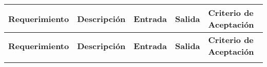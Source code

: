 {\small
  \begin{longtable}[c]{c p{3.5cm} p{2.2cm} p{2.2cm} p{3.5cm}}
    \hline
    \textbf{Requerimiento} & \textbf{Descripción}                                                                                    & \textbf{Entrada}                                                  & \textbf{Salida}                                                       & \textbf{Criterio de Aceptación}                                                       \\
    \hline
    \endfirsthead

    \hline
    \textbf{Requerimiento} & \textbf{Descripción}                                                                                    & \textbf{Entrada}                                                  & \textbf{Salida}                                                       & \textbf{Criterio de Aceptación}                                                       \\
    \hline
    \endhead
    \endfoot
    \endlastfoot


\end{longtable}}
